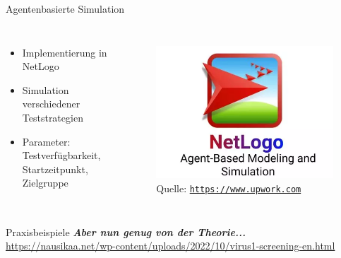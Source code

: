 \documentclass[ngerman,14pt,aspectratio=1610]{beamer}
\newcommand{\source}{}
\begin{document}
	\renewcommand{\source}{ }
	
	\begin{frame}[t]{Agentenbasierte Simulation} \vspace{30pt}		
		\begin{columns}[T, onlytextwidth]
			\begin{itemize}
				\item Implementierung in NetLogo
				\item Simulation verschiedener Teststrategien
				\item Parameter: Testverfügbarkeit, Startzeitpunkt, Zielgruppe
			\end{itemize}
			
			\begin{figure}[h]
				\centering
				\includegraphics[width=\linewidth]{netlogo}
				\tiny Quelle: \href{https://www.upwork.com/services/product/development-it-a-netlogo-agent-based-simulation-model-1351194777425215488}{\texttt{https://www.upwork.com}}
			\end{figure}
			
		\end{columns}
	\end{frame}
	
	\begin{frame}[t]{Praxisbeispiele} \vspace{60pt}
		\textbf{\textit{Aber nun genug von der Theorie...}}\\
		\bigskip
		\url{https://nausikaa.net/wp-content/uploads/2022/10/virus1-screening-en.html}
	\end{frame}
	
\end{document}
